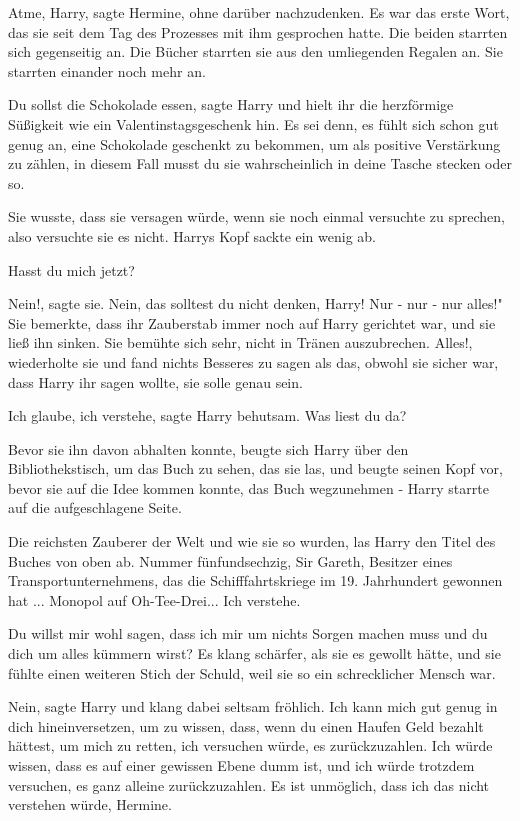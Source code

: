 \glqq{}Atme, Harry\grqq{}, sagte Hermine, ohne darüber nachzudenken. Es war das
erste Wort, das sie seit dem Tag des Prozesses mit ihm gesprochen hatte. Die
beiden starrten sich gegenseitig an. Die Bücher starrten sie aus den umliegenden
Regalen an. Sie starrten einander noch mehr an.

\glqq{}Du sollst die Schokolade essen\grqq{}, sagte Harry und hielt ihr die
herzförmige Süßigkeit wie ein Valentinstagsgeschenk hin. \glqq{}Es sei denn, es
fühlt sich schon gut genug an, eine Schokolade geschenkt zu bekommen, um als
positive Verstärkung zu zählen, in diesem Fall musst du sie wahrscheinlich in
deine Tasche stecken oder so.\grqq{}

Sie wusste, dass sie versagen würde, wenn sie noch einmal versuchte zu sprechen,
also versuchte sie es nicht. Harrys Kopf sackte ein wenig ab.

\glqq{}Hasst du mich jetzt?\grqq{}

\glqq{}Nein!\grqq{}, sagte sie. \glqq{}Nein, das solltest du nicht denken, Harry!
Nur - nur - nur alles!" Sie bemerkte, dass ihr Zauberstab immer noch auf Harry
gerichtet war, und sie ließ ihn sinken. Sie bemühte sich sehr, nicht in Tränen
auszubrechen. \glqq{}Alles!\grqq{}, wiederholte sie und fand nichts Besseres zu
sagen als das, obwohl sie sicher war, dass Harry ihr sagen wollte, sie solle
genau sein.

\glqq{}Ich glaube, ich verstehe\grqq{}, sagte Harry behutsam. \glqq{}Was liest du
da?\grqq{}

Bevor sie ihn davon abhalten konnte, beugte sich Harry über den
Bibliothekstisch, um das Buch zu sehen, das sie las, und beugte seinen Kopf vor,
bevor sie auf die Idee kommen konnte, das Buch wegzunehmen - Harry starrte auf
die aufgeschlagene Seite.

\glqq{}Die reichsten Zauberer der Welt und wie sie so wurden\grqq{}, las Harry
den Titel des Buches von oben ab. \glqq{}Nummer fünfundsechzig, Sir Gareth,
Besitzer eines Transportunternehmens, das die Schifffahrtskriege im 19.
Jahrhundert gewonnen hat ... Monopol auf Oh-Tee-Drei... Ich verstehe.\grqq{}

\glqq{}Du willst mir wohl sagen, dass ich mir um nichts Sorgen machen muss und du
dich um alles kümmern wirst?\grqq{} Es klang schärfer, als sie es gewollt hätte,
und sie fühlte einen weiteren Stich der Schuld, weil sie so ein schrecklicher
Mensch war.

\glqq{}Nein\grqq{}, sagte Harry und klang dabei seltsam fröhlich. \glqq{}Ich kann
mich gut genug in dich hineinversetzen, um zu wissen, dass, wenn du einen Haufen
Geld bezahlt hättest, um mich zu retten, ich versuchen würde, es zurückzuzahlen.
Ich würde wissen, dass es auf einer gewissen Ebene dumm ist, und ich würde
trotzdem versuchen, es ganz alleine zurückzuzahlen. Es ist unmöglich, dass ich
das nicht verstehen würde, Hermine.\grqq{}

